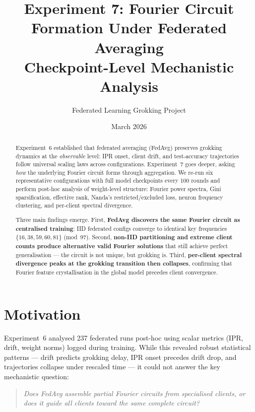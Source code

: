 \documentclass{article}
\title{Experiment 7: Fourier Circuit Formation Under Federated Averaging\\[4pt]
\large Checkpoint-Level Mechanistic Analysis}
\author{Federated Learning Grokking Project}
\date{March 2026}
\begin{document}
\maketitle

\begin{abstract}
Experiment~6 established that federated averaging (FedAvg) preserves grokking
dynamics at the \emph{observable} level: IPR onset, client drift, and
test-accuracy trajectories follow universal scaling laws across
configurations.  Experiment~7 goes deeper, asking \emph{how} the underlying
Fourier circuit forms through aggregation.  We re-run six representative
configurations with full model checkpoints every 100 rounds and perform
post-hoc analysis of weight-level structure: Fourier power spectra, Gini
sparsification, effective rank, Nanda's restricted/excluded loss, neuron
frequency clustering, and per-client spectral divergence.

Three main findings emerge.  First, \textbf{FedAvg discovers the same Fourier
circuit as centralised training}: IID federated configs converge to identical
key frequencies $\{16, 38, 59, 60, 81\}$ (mod~97).  Second,
\textbf{non-IID partitioning and extreme client counts produce alternative
valid Fourier solutions} that still achieve perfect generalisation --- the
circuit is not unique, but grokking is.  Third, \textbf{per-client spectral
divergence peaks at the grokking transition then collapses}, confirming that
Fourier feature crystallisation in the global model precedes client
convergence.
\end{abstract}

\section{Motivation}

Experiment~6 analysed 237 federated runs post-hoc using scalar metrics (IPR,
drift, weight norms) logged during training.  While this revealed robust
statistical patterns --- drift predicts grokking delay, IPR onset precedes
drift drop, and trajectories collapse under rescaled time --- it could not
answer the key mechanistic question:

\begin{quote}
\emph{Does FedAvg assemble partial Fourier circuits from specialised clients,
or does it guide all clients toward the same complete circuit?}
\end{quote}
\end{document}
